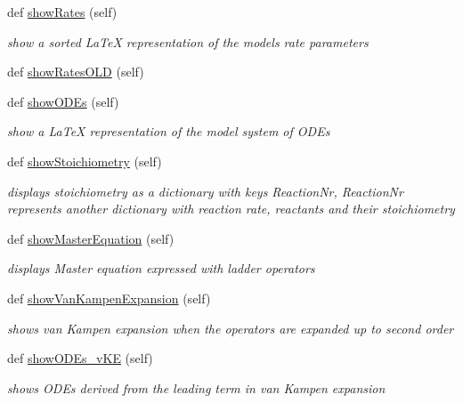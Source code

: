 \begin{DoxyCompactItemize}
def \hyperlink{class_mu_mo_t_1_1_mu_mo_t_1_1_mu_mo_tmodel_a9c88600ec8eda7be7b7faeacd99f1682}{show\+Rates} (self)
\begin{DoxyCompactList}\small\item\em show a sorted La\+TeX representation of the model\textquotesingle{}s rate parameters \end{DoxyCompactList}\item 
def \hyperlink{class_mu_mo_t_1_1_mu_mo_t_1_1_mu_mo_tmodel_a37bb7737e6b0ac4737b32541f20bafc4}{show\+Rates\+O\+LD} (self)
\item 
def \hyperlink{class_mu_mo_t_1_1_mu_mo_t_1_1_mu_mo_tmodel_aa3a519a3aac92f7c132c63fb12d3de13}{show\+O\+D\+Es} (self)
\begin{DoxyCompactList}\small\item\em show a La\+TeX representation of the model system of O\+D\+Es \end{DoxyCompactList}\item 
def \hyperlink{class_mu_mo_t_1_1_mu_mo_t_1_1_mu_mo_tmodel_a4ee4dff9d907c7245917bec93795d663}{show\+Stoichiometry} (self)
\begin{DoxyCompactList}\small\item\em displays stoichiometry as a dictionary with keys Reaction\+Nr, Reaction\+Nr represents another dictionary with reaction rate, reactants and their stoichiometry \end{DoxyCompactList}\item 
def \hyperlink{class_mu_mo_t_1_1_mu_mo_t_1_1_mu_mo_tmodel_a2d73fce0efa141df05f6d5e14959a135}{show\+Master\+Equation} (self)
\begin{DoxyCompactList}\small\item\em displays Master equation expressed with ladder operators \end{DoxyCompactList}\item 
def \hyperlink{class_mu_mo_t_1_1_mu_mo_t_1_1_mu_mo_tmodel_a870a1b1e8bba9034173be730dfb6fbbb}{show\+Van\+Kampen\+Expansion} (self)
\begin{DoxyCompactList}\small\item\em shows van Kampen expansion when the operators are expanded up to second order \end{DoxyCompactList}\item 
def \hyperlink{class_mu_mo_t_1_1_mu_mo_t_1_1_mu_mo_tmodel_a7d00fbda7051f341284a7d4d5edbec52}{show\+O\+D\+Es\+\_\+v\+KE} (self)
\begin{DoxyCompactList}\small\item\em shows O\+D\+Es derived from the leading term in van Kampen expansion \end{DoxyCompactList}\item 

\end{DoxyCompactItemize}
